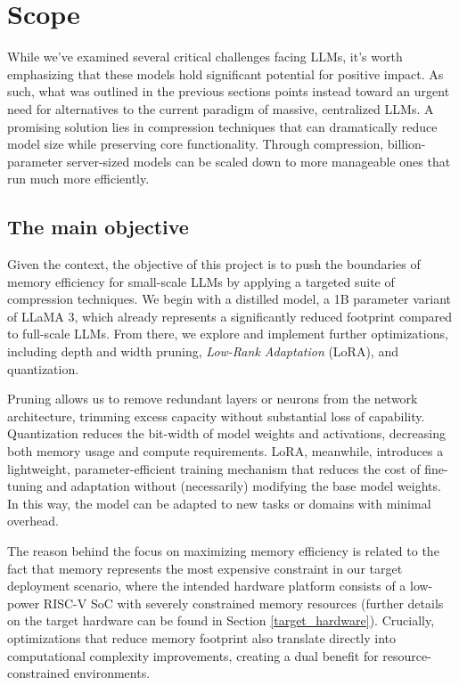\section{Scope}
While we've examined several critical challenges facing LLMs, it's worth emphasizing that these models hold significant potential for positive impact. As such, what was outlined in the previous sections points instead toward an urgent need for alternatives to the current paradigm of massive, centralized LLMs. A promising solution lies in compression techniques that can dramatically reduce model size while preserving core functionality. Through compression, billion-parameter server-sized models can be scaled down to more manageable ones that run much more efficiently.

\subsection{The main objective}
Given the context, the objective of this project is to push the boundaries of memory efficiency for small-scale LLMs by applying a targeted suite of compression techniques. We begin with a distilled model, a 1B parameter variant of LLaMA 3, which already represents a significantly reduced footprint compared to full-scale LLMs. From there, we explore and implement further optimizations, including depth and width pruning, \textit{Low-Rank Adaptation} (LoRA), and quantization.

Pruning allows us to remove redundant layers or neurons from the network architecture, trimming excess capacity without substantial loss of capability. Quantization reduces the bit-width of model weights and activations, decreasing both memory usage and compute requirements. LoRA, meanwhile, introduces a lightweight, parameter-efficient training mechanism that reduces the cost of fine-tuning and adaptation without (necessarily) modifying the base model weights. In this way, the model can be adapted to new tasks or domains with minimal overhead.

The reason behind the focus on maximizing memory efficiency is related to the fact that memory represents the most expensive constraint in our target deployment scenario, where the intended hardware platform consists of a low-power RISC-V SoC with severely constrained memory resources (further details on the target hardware can be found in Section \ref{target_hardware}). Crucially, optimizations that reduce memory footprint also translate directly into computational complexity improvements, creating a dual benefit for resource-constrained environments.

